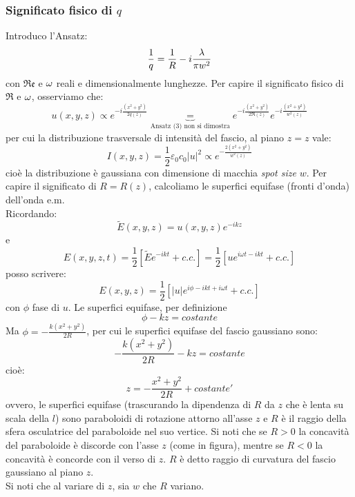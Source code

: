 \subsubsection{Significato fisico di $q$} Introduco l'Ansatz:
\begin{equation*}
\frac{1}{q} = \frac{1}{R} - i\frac{\lambda}{\pi w^2}
\end{equation*}
con $\mathfrak{Re}$ e $\omega$ reali e dimensionalmente lunghezze.
Per capire il significato fisico di $\Re$ e $\omega$, osserviamo che:
\begin{equation*}
u(x,y,z) \propto e^{-i\frac{(x^2 + y^2)}{2q(z)}} \underbrace{=}_\text{Ansatz (3) non si dimostra} e^{-i\frac{(x^2 + y^2)}{2\Re(z)}} e^{-i\frac{(x^2 + y^2)}{w^2(z)}}
\end{equation*}
per cui la distribuzione trasversale di intensità del fascio, al piano $z = z$ vale:
\begin{equation*}
I(x,y,z) = \frac{1}{2} \varepsilon_0 c_0 |u|^2 \propto e^{-\frac{2 (x^2 + y^2)}{w^2(z)}}
\end{equation*}
cioè la distribuzione è gaussiana con dimensione di macchia \textit{spot size} $w$.
Per capire il significato di $R = R(z)$, calcoliamo le superfici equifase (fronti d'onda) dell'onda e.m.\\
Ricordando:
\begin{equation*}
\widetilde{E}(x,y,z) = u(x,y,z) e^{-ikz}
\end{equation*}
e
\begin{equation*}
E(x,y,z,t) = \frac{1}{2} \left[\widetilde{E} e^{-ikt} + c.c.\right] = \frac{1}{2} \left[u e^{i\omega t-ikt} + c.c.\right]
\end{equation*}
posso scrivere:
\begin{equation*}
E(x,y,z) = \frac{1}{2} \left[|u| e^{i\phi-ikt + i\omega t} + c.c.\right]
\end{equation*}
con $\phi$ fase di $u$. Le superfici equifase, per definizione
\begin{equation*}
\phi - kz = costante
\end{equation*}
Ma $\phi = -\frac{k (x^2 + y^2)}{2R}$, per cui le superfici equifase del fascio gaussiano sono:
\begin{equation*}
-\frac{k (x^2 + y^2)}{2R} - kz = costante
\end{equation*}
cioè:
\begin{equation*}
z = - \frac{x^2 + y^2}{2R} + costante'
\end{equation*}
ovvero, le superfici equifase (trascurando la dipendenza di $R$ da $z$ che è lenta su scala della $l$) sono paraboloidi di rotazione attorno all'asse $z$ e $R$ è il raggio della sfera osculatrice del paraboloide nel suo vertice.
Si noti che se $R > 0$ la concavità del paraboloide è discorde con l'asse $z$ (come in figura), mentre se $R < 0$ la concavità è concorde con il verso di $z$. $R$ è detto raggio di curvatura del fascio gaussiano al piano $z$.\\
Si noti che al variare di $z$, sia $w$ che $R$ variano.

